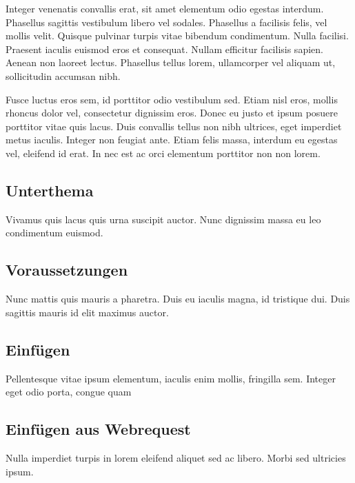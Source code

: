 Integer venenatis convallis erat, sit amet elementum odio egestas interdum. Phasellus sagittis vestibulum libero vel sodales. Phasellus a facilisis felis, vel mollis velit. Quisque pulvinar turpis vitae bibendum condimentum. Nulla facilisi. Praesent iaculis euismod eros et consequat. Nullam efficitur facilisis sapien. Aenean non laoreet lectus. Phasellus tellus lorem, ullamcorper vel aliquam ut, sollicitudin accumsan nibh. 

Fusce luctus eros sem, id porttitor odio vestibulum sed. Etiam nisl eros, mollis rhoncus dolor vel, consectetur dignissim eros. Donec eu justo et ipsum posuere porttitor vitae quis lacus. Duis convallis tellus non nibh ultrices, eget imperdiet metus iaculis. Integer non feugiat ante. Etiam felis massa, interdum eu egestas vel, eleifend id erat. In nec est ac orci elementum porttitor non non lorem. 

\clearpage

\subsection{Unterthema}

Vivamus quis lacus quis urna suscipit auctor. Nunc dignissim massa eu leo condimentum euismod. 

\subsection{Voraussetzungen}

Nunc mattis quis mauris a pharetra. Duis eu iaculis magna, id tristique dui. Duis sagittis mauris id elit maximus auctor. 

\subsection{Einfügen}


Pellentesque vitae ipsum elementum, iaculis enim mollis, fringilla sem. Integer eget odio porta, congue quam 

\subsection{Einfügen aus Webrequest}

Nulla imperdiet turpis in lorem eleifend aliquet sed ac libero. Morbi sed ultricies ipsum. 
